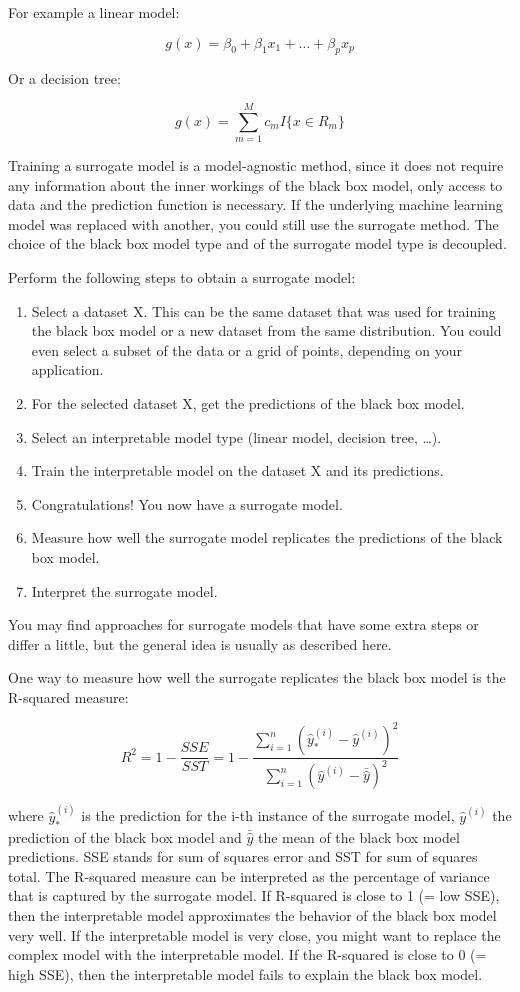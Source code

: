 \documentclass[
  12pt,
]{krantz}
\providecommand{\tightlist}{%
  \setlength{\itemsep}{0pt}\setlength{\parskip}{0pt}}
\begin{document}
For example a linear model:

\[g(x)=\beta_0+\beta_1{}x_1{}+\ldots+\beta_p{}x_p\]

Or a decision tree:

\[g(x)=\sum_{m=1}^Mc_m{}I\{x\in{}R_m\}\]

Training a surrogate model is a model-agnostic method, since it does not require any information about the inner workings of the black box model, only access to data and the prediction function is necessary.
If the underlying machine learning model was replaced with another, you could still use the surrogate method.
The choice of the black box model type and of the surrogate model type is decoupled.

Perform the following steps to obtain a surrogate model:

\begin{enumerate}
\def\labelenumi{\arabic{enumi}.}
\tightlist
\item
  Select a dataset X.
  This can be the same dataset that was used for training the black box model or a new dataset from the same distribution.
  You could even select a subset of the data or a grid of points, depending on your application.
\item
  For the selected dataset X, get the predictions of the black box model.
\item
  Select an interpretable model type (linear model, decision tree, \ldots).
\item
  Train the interpretable model on the dataset X and its predictions.
\item
  Congratulations! You now have a surrogate model.
\item
  Measure how well the surrogate model replicates the predictions of the black box model.
\item
  Interpret the surrogate model.
\end{enumerate}

You may find approaches for surrogate models that have some extra steps or differ a little, but the general idea is usually as described here.

One way to measure how well the surrogate replicates the black box model is the R-squared measure:

\[R^2=1-\frac{SSE}{SST}=1-\frac{\sum_{i=1}^n(\hat{y}_*^{(i)}-\hat{y}^{(i)})^2}{\sum_{i=1}^n(\hat{y}^{(i)}-\bar{\hat{y}})^2}\]

where \(\hat{y}_*^{(i)}\) is the prediction for the i-th instance of the surrogate model, \(\hat{y}^{(i)}\) the prediction of the black box model and \(\bar{\hat{y}}\) the mean of the black box model predictions.
SSE stands for sum of squares error and SST for sum of squares total.
The R-squared measure can be interpreted as the percentage of variance that is captured by the surrogate model.
If R-squared is close to 1 (= low SSE), then the interpretable model approximates the behavior of the black box model very well.
If the interpretable model is very close, you might want to replace the complex model with the interpretable model.
If the R-squared is close to 0 (= high SSE), then the interpretable model fails to explain the black box model.
\end{document}
